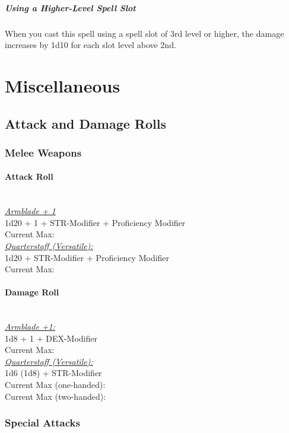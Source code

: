 \documentclass[letterpaper,openany,oneside,twocolumn]{book}
\begin{document}
\subparagraph*{Using a Higher-Level Spell Slot} When you cast this spell using a spell slot of 3rd level or higher, the damage increases by 1d10 for each slot level above 2nd.

\section*{Miscellaneous}
\subsection*{Attack and Damage Rolls}
\subsubsection*{Melee Weapons}
\paragraph*{Attack Roll}\hfill\\
\underline{\textit{Armblade + 1}}\\
1d20 + 1 + STR-Modifier + Proficiency Modifier\\
\indent Current Max: 
\\
\underline{\textit{Quarterstaff (Versatile):}}\\
1d20 + STR-Modifier + Proficiency Modifier\\
\indent Current Max: 
\paragraph*{Damage Roll}\hfill\\
\underline{\textit{Armblade +1:}}\\
1d8 + 1 + DEX-Modifier\\
\indent Current Max: 
\\
\underline{\textit{Quarterstaff (Versatile):}}\\
1d6 (1d8) + STR-Modifier\\
\indent Current Max (one-handed): \\
\indent Current Max (two-handed): 
\subsubsection*{Special Attacks}
\end{document}
